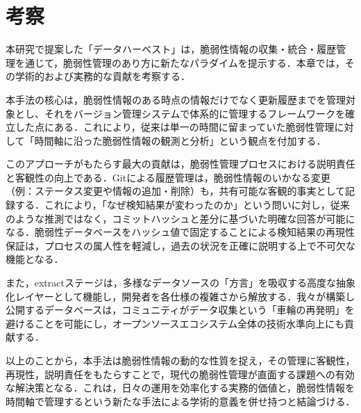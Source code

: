 \section{考察}

本研究で提案した「データハーベスト」は，脆弱性情報の収集・統合・履歴管理を通じて，脆弱性管理のあり方に新たなパラダイムを提示する．本章では，その学術的および実務的な貢献を考察する．

本手法の核心は，脆弱性情報のある時点の情報だけでなく更新履歴までを管理対象とし、それをバージョン管理システムで体系的に管理するフレームワークを確立した点にある．これにより，従来は単一の時間に留まっていた脆弱性管理に対して「時間軸に沿った脆弱性情報の観測と分析」という観点を付加する．

このアプローチがもたらす最大の貢献は，脆弱性管理プロセスにおける説明責任と客観性の向上である．Gitによる履歴管理は，脆弱性情報のいかなる変更（例：ステータス変更や情報の追加・削除）も，共有可能な客観的事実として記録する．これにより，「なぜ検知結果が変わったのか」という問いに対し，従来のような推測ではなく，コミットハッシュと差分に基づいた明確な回答が可能になる．脆弱性データベースをハッシュ値で固定することによる検知結果の再現性保証は，プロセスの属人性を軽減し，過去の状況を正確に説明する上で不可欠な機能となる．

また，extractステージは，多様なデータソースの「方言」を吸収する高度な抽象化レイヤーとして機能し，開発者を各仕様の複雑さから解放する．我々が構築し公開するデータベースは，コミュニティがデータ収集という「車輪の再発明」を避けることを可能にし，オープンソースエコシステム全体の技術水準向上にも貢献する．

以上のことから，本手法は脆弱性情報の動的な性質を捉え，その管理に客観性，再現性，説明責任をもたらすことで，現代の脆弱性管理が直面する課題への有効な解決策となる．これは，日々の運用を効率化する実務的価値と，脆弱性情報を時間軸で管理するという新たな手法による学術的意義を併せ持つと結論づける．
